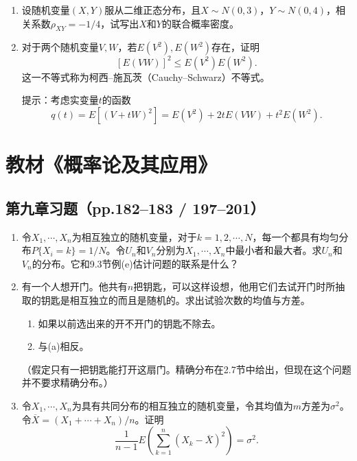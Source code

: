 \documentclass[UTF8]{ctexart}
\begin{document}
\begin{enumerate}
\item 设随机变量$(X,Y)$服从二维正态分布，且$X\sim N(0,3)$，$Y\sim N(0,4)$，相关系数$\rho_{XY}=-1/4$，试写出$X$和$Y$的联合概率密度。

\setcounter{enumi}{36}
\item 对于两个随机变量$V,W$，若$E(V^{2}),E(W^{2})$存在，证明
\[
[E(VW)]^{2}\le E(V^{2})E(W^{2}).
\]
这一不等式称为柯西--施瓦茨（Cauchy--Schwarz）不等式。

提示：考虑实变量$t$的函数
\[
q(t)=E[(V+tW)^{2}]=E(V^{2})+2tE(VW)+t^{2}E(W^{2}).
\]
\end{enumerate}

\section*{教材《概率论及其应用》}

\subsection*{第九章习题（pp.182--183 / 197--201）}

\begin{enumerate}
\renewcommand{\labelenumi}{\textbf{\arabic{enumi}.}}
\setcounter{enumi}{7}
\item 令$X_{1},\cdots,X_{n}$为相互独立的随机变量，对于$k=1,2,\cdots,N$，每一个都具有均匀分布$P\{X_{i}=k\}=1/N$。令$U_{n}$和$V_{n}$分别为$X_{1},\cdots,X_{n}$中最小者和最大者。求$U_{n}$和$V_{n}$的分布。它和9.3节例(e)估计问题的联系是什么？

\setcounter{enumi}{18}
\item 有一个人想开门。他共有$n$把钥匙，可以这样设想，他用它们去试开门时所抽取的钥匙是相互独立的而且是随机的。求出试验次数的均值与方差。
\begin{enumerate}
\item[(a)] 如果以前选出来的开不开门的钥匙不除去。
\item[(b)] 与(a)相反。
\end{enumerate}
（假定只有一把钥匙能打开这扇门。精确分布在2.7节中给出，但现在这个问题并不要求精确分布。）

\setcounter{enumi}{37}
\item 令$X_{1},\cdots,X_{n}$为具有共同分布的相互独立的随机变量，令其均值为$m$方差为$\sigma^{2}$。令$\overline{X}=(X_{1}+\cdots+X_{n})/n$。证明
\[
\frac{1}{n-1}E\left(\sum_{k=1}^{n}(X_{k}-\overline{X})^{2}\right)=\sigma^{2}.
\]
\end{enumerate}
\end{document}
